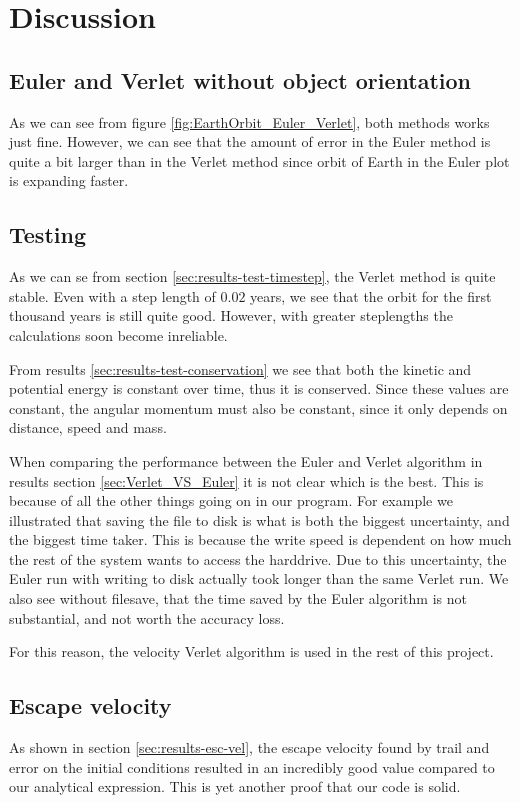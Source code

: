 \documentclass[../main.tex]{subfiles}
\begin{document}
\section{Discussion}\label{sec:discussion}

\subsection{Euler and Verlet without object orientation}
As we can see from figure \ref{fig:EarthOrbit_Euler_Verlet}, both methods works just fine. However, we can see that the amount of error in the Euler method is quite a bit larger than in the Verlet method since orbit of Earth in the Euler plot is expanding faster.

\subsection{Testing}
As we can se from section \ref{sec:results-test-timestep}, the Verlet method is quite stable. Even with a step length of $0.02$ years, we see that the orbit for the first thousand years is still quite good. However, with greater steplengths the calculations soon become inreliable.

From results \ref{sec:results-test-conservation} we see that both the kinetic and potential energy is constant over time, thus it is conserved. Since these values are constant, the angular momentum must also be constant, since it only depends on distance, speed and mass.


When comparing the performance between the Euler and Verlet algorithm in results section \ref{sec:Verlet_VS_Euler} it is not clear which is the best. This is because of all the other things going on in our program. For example we illustrated that saving the file to disk is what is both the biggest uncertainty, and the biggest time taker. This is because the write speed is dependent on how much the rest of the system wants to access the harddrive. Due to this uncertainty, the Euler run with writing to disk actually took longer than the same Verlet run. We also see without filesave, that the time saved by the Euler algorithm is not substantial, and not worth the accuracy loss.

For this reason, the velocity Verlet algorithm is used in the rest of this project.

\subsection{Escape velocity}
As shown in section \ref{sec:results-esc-vel}, the escape velocity found by trail and error on the initial conditions resulted in an incredibly good value compared to our analytical expression. This is yet another proof that our code is solid.
\end{document}
